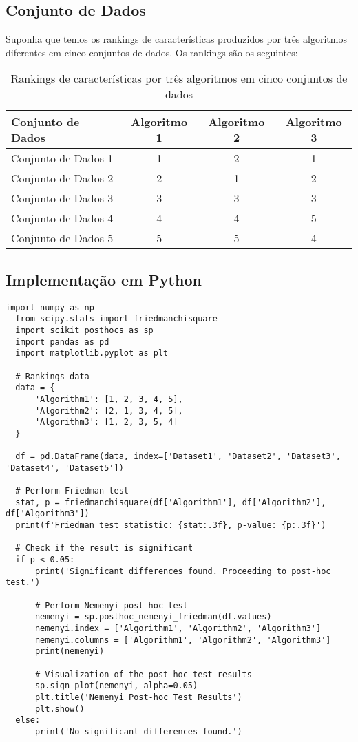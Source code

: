 \documentclass{article}
\begin{document}
\subsection*{Conjunto de Dados}

Suponha que temos os rankings de características produzidos por três algoritmos diferentes em cinco conjuntos de dados. Os rankings são os seguintes:

\begin{table}[h!]
\centering
\begin{tabular}{lccc}
\hline
\textbf{Conjunto de Dados} & \textbf{Algoritmo 1} & \textbf{Algoritmo 2} & \textbf{Algoritmo 3} \\
\hline
Conjunto de Dados 1 & 1 & 2 & 1 \\
Conjunto de Dados 2 & 2 & 1 & 2 \\
Conjunto de Dados 3 & 3 & 3 & 3 \\
Conjunto de Dados 4 & 4 & 4 & 5 \\
Conjunto de Dados 5 & 5 & 5 & 4 \\
\hline
\end{tabular}
\caption{Rankings de características por três algoritmos em cinco conjuntos de dados}
\end{table}

\subsection*{Implementação em Python}

\begin{lstlisting}[style=pythonstyle, caption={Python code for Friedman test and post-hoc analysis}]
  import numpy as np
  from scipy.stats import friedmanchisquare
  import scikit_posthocs as sp
  import pandas as pd
  import matplotlib.pyplot as plt
  
  # Rankings data
  data = {
      'Algorithm1': [1, 2, 3, 4, 5],
      'Algorithm2': [2, 1, 3, 4, 5],
      'Algorithm3': [1, 2, 3, 5, 4]
  }
  
  df = pd.DataFrame(data, index=['Dataset1', 'Dataset2', 'Dataset3', 'Dataset4', 'Dataset5'])
  
  # Perform Friedman test
  stat, p = friedmanchisquare(df['Algorithm1'], df['Algorithm2'], df['Algorithm3'])
  print(f'Friedman test statistic: {stat:.3f}, p-value: {p:.3f}')
  
  # Check if the result is significant
  if p < 0.05:
      print('Significant differences found. Proceeding to post-hoc test.')
      
      # Perform Nemenyi post-hoc test
      nemenyi = sp.posthoc_nemenyi_friedman(df.values)
      nemenyi.index = ['Algorithm1', 'Algorithm2', 'Algorithm3']
      nemenyi.columns = ['Algorithm1', 'Algorithm2', 'Algorithm3']
      print(nemenyi)
      
      # Visualization of the post-hoc test results
      sp.sign_plot(nemenyi, alpha=0.05)
      plt.title('Nemenyi Post-hoc Test Results')
      plt.show()
  else:
      print('No significant differences found.')
  \end{lstlisting}
\end{document}
